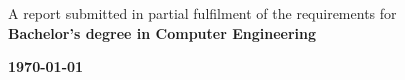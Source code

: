 \documentclass[a4paper,11pt,oneside]{book}
\begin{document}
\begin{titlepage}
\begin{center}
            {\large A report submitted in partial fulfilment of the requirements for\\[0.5cm]
                        \textbf{Bachelor's degree in Computer Engineering}}\\[0.5cm]
            \vfill
            
            {\large\textbf{\today}} %
            
            \vspace{1cm}
        \end{center}
    \end{titlepage}
    
    
    
    
    
\end{document}
